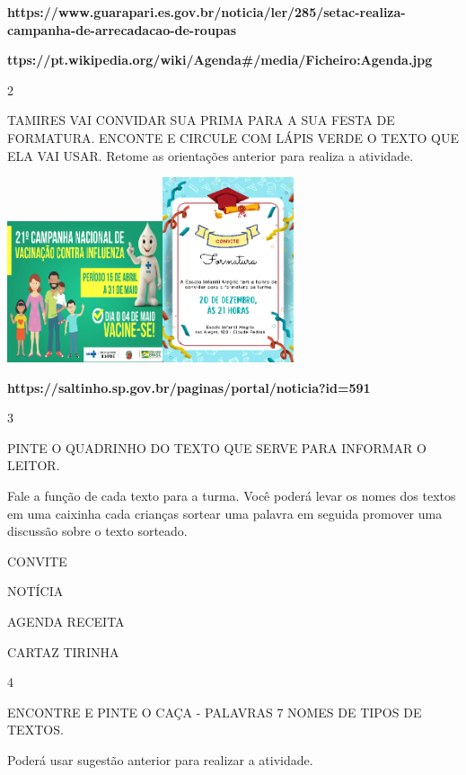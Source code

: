 {{\textbf{https://www.guarapari.es.gov.br/noticia/ler/285/setac-realiza-campanha-de-arrecadacao-de-roupas}

\textbf{ttps://pt.wikipedia.org/wiki/Agenda\#/media/Ficheiro:Agenda.jpg}

\num{2}

TAMIRES VAI CONVIDAR SUA PRIMA PARA A SUA FESTA DE FORMATURA. ENCONTE E
CIRCULE COM LÁPIS VERDE O TEXTO QUE ELA VAI USAR. Retome as orientações
anterior para realiza a atividade.

\includegraphics[width=1.80556in,height=1.63403in]{media/image100.png}\includegraphics[width=1.51458in,height=2.14444in]{media/image103.png}

\textbf{https://saltinho.sp.gov.br/paginas/portal/noticia?id=591}

\num{3}

PINTE O QUADRINHO DO TEXTO QUE SERVE PARA INFORMAR O LEITOR.

Fale a função de cada texto para a turma. Você poderá levar os nomes dos
textos em uma caixinha cada crianças sortear uma palavra em seguida
promover uma discussão sobre o texto sorteado.

CONVITE

NOTÍCIA

AGENDA RECEITA

CARTAZ TIRINHA

\num{4}

ENCONTRE E PINTE O CAÇA - PALAVRAS 7 NOMES DE TIPOS DE TEXTOS.

Poderá usar sugestão anterior para realizar a atividade.

}}
